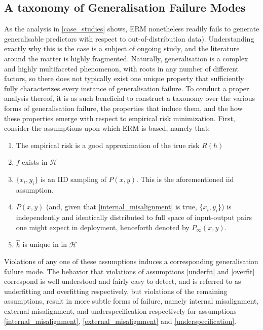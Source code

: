 	\subsection{A taxonomy of Generalisation Failure Modes}
		As the analysis in \ref{case_studies} shows, ERM nonetheless readily fails to generate generalisable predictors with respect to out-of-distribution data). Understanding exactly why this is the case is a subject of ongoing study, and the literature around the matter is highly fragmented. Naturally, generalisation is a complex and highly multifaceted phenomenon, with roots in any number of different factors, so there does not typically exist one unique property that sufficiently fully characterizes every instance of generalisation failure. To conduct a proper analysis thereof, it is as such beneficial to construct a taxonomy over the various forms of generalisation failure, the properties that induce them, and the how these properties emerge with respect to empirical risk minimization. First, consider the assumptions upon which ERM is based, namely that:
		\begin{enumerate}
			\item The empirical risk is a good approximation of the true risk \(R(h)\) \label{overfit}
			\item \(f\) exists in \(\mathcal{H}\) \label{underfit}
			\item \(\{x_i, y_i\}\) is an IID sampling of \(P(x,y)\). This is the aforementioned iid assumption. \label{internal_misalignment}
			\item \(P(x,y)\) (and, given that \ref{internal_misalignment} is true, \(\{x_i, y_i\}\)) is independently and identically distributed to full space of input-output pairs one might expect in deployment, henceforth denoted by \(P_{\infty}(x,y)\). \label{external_misalignment}
			\item \(\hat{h}\) is unique in in \(\mathcal{H}\) \label{underspecification}
		\end{enumerate}  
		
		Violations of any one of these assumptions induces a corresponding generalisation failure mode. The behavior that violations of assumptions \ref{underfit} and \ref{overfit} correspond is well understood and fairly easy to detect, and is referred to as underfitting and overfitting respectively, but violations of the remaining assumptions, result in more subtle forms of failure, namely internal misalignment, external misalignment, and underspecification respectively for assumptions \ref{internal_misalignment}, \ref{external_misalignment} and \ref{underspecification}.
			
